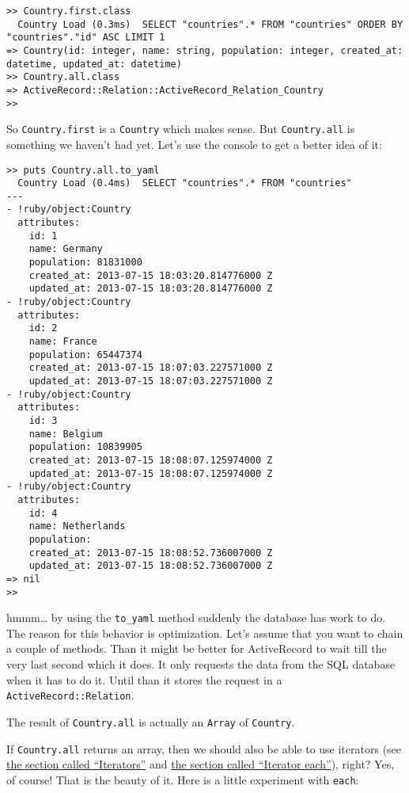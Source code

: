 \documentclass[a4paper]{book}
\newcounter{tab}[chapter]
\begin{document}
\begin{shaded}\begin{verbatim}
>> Country.first.class
  Country Load (0.3ms)  SELECT "countries".* FROM "countries" ORDER BY "countries"."id" ASC LIMIT 1
=> Country(id: integer, name: string, population: integer, created_at: datetime, updated_at: datetime)
>> Country.all.class
=> ActiveRecord::Relation::ActiveRecord_Relation_Country
>>
\end{verbatim}\end{shaded}

So \texttt{Country.first} is a \texttt{Country} which makes sense. But \texttt{Country.all} is something we haven't had yet. Let's use the console to get a better idea of it:

\begin{shaded}\begin{verbatim}
>> puts Country.all.to_yaml
  Country Load (0.4ms)  SELECT "countries".* FROM "countries"
---
- !ruby/object:Country
  attributes:
    id: 1
    name: Germany
    population: 81831000
    created_at: 2013-07-15 18:03:20.814776000 Z
    updated_at: 2013-07-15 18:03:20.814776000 Z
- !ruby/object:Country
  attributes:
    id: 2
    name: France
    population: 65447374
    created_at: 2013-07-15 18:07:03.227571000 Z
    updated_at: 2013-07-15 18:07:03.227571000 Z
- !ruby/object:Country
  attributes:
    id: 3
    name: Belgium
    population: 10839905
    created_at: 2013-07-15 18:08:07.125974000 Z
    updated_at: 2013-07-15 18:08:07.125974000 Z
- !ruby/object:Country
  attributes:
    id: 4
    name: Netherlands
    population:
    created_at: 2013-07-15 18:08:52.736007000 Z
    updated_at: 2013-07-15 18:08:52.736007000 Z
=> nil
>>
\end{verbatim}\end{shaded}

hmmm\ldots{} by using the \texttt{to\_yaml} method suddenly the database has work to do. The reason for this behavior is optimization. Let's assume that you want to chain a couple of methods. Than it might be better for ActiveRecord to wait till the very last second which it does. It only requests the data from the SQL database when it has to do it. Until than it stores the request in a \texttt{ActiveRecord::Relation}.

The result of \texttt{Country.all} is actually an \texttt{Array} of \texttt{Country}.

If \texttt{Country.all} returns an array, then we should also be able to use iterators (see \hyperref[iterator]{the section called “Iterators”} and \hyperref[arrayux5fiterator]{the section called “Iterator each”}), right? Yes, of course! That is the beauty of it. Here is a little experiment with \texttt{each}:
\end{document}
